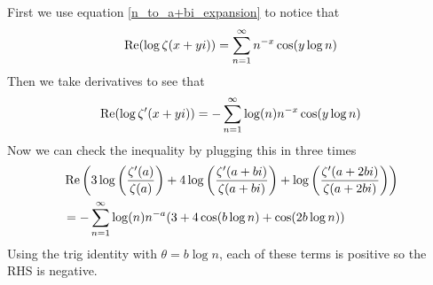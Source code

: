 \documentclass{homework}
\begin{document}
                                                                                                                                \begin{solution}
                                                                                                                                First we use equation \eqref{n_to_a+bi_expansion} to notice that
                                                                                                                                \[
                                                                                                                                \operatorname{Re}(\log\zeta(x+yi)) = \sum_{n=1}^\infty n^{-x}\cos(y\log n)
                                                                                                                                \]
                                                                                                                                Then we take derivatives to see that
                                                                                                                                \begin{align*}
                                                                                                                                \operatorname{Re}(\log\zeta'(x+yi)) = -\sum_{n=1}^\infty \log(n) n^{-x}\cos(y\log n)
                                                                                                                                \end{align*}
                                                                                                                                Now we can check the inequality by plugging this in three times
                                                                                                                                \begin{align*}
                                                                                                                                &\operatorname{Re}\left(3\log\left(\frac{\zeta'(a)}{\zeta(a)}\right) + 4\log\left(\frac{\zeta'(a+bi)}{\zeta(a+bi)}\right) + \log\left(\frac{\zeta'(a+2bi)}{\zeta(a+2bi)}\right)\right)\\
                                                                                                                                &= -\sum_{n=1}^\infty \log(n) n^{-a}(3 + 4\cos(b\log n) + \cos(2b\log n)) 
                                                                                                                                \end{align*}
                                                                                                                                Using the trig identity with $\theta = b\log n$, each of these terms is positive so the RHS is negative.


\end{solution}
\end{document}
